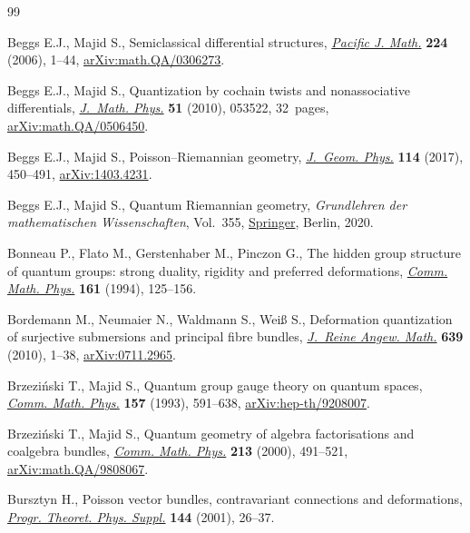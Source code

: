 \documentclass[10pt,a4paper]{amsart}
\numberwithin{equation}{section}
\newcommand{\<}{{\langle}}
\renewcommand{\>}{{\rangle}}
\begin{document}
\begin{thebibliography}{99}
\footnotesize\itemsep=-1pt

Beggs E.J., Majid S., Semiclassical differential structures, \href{https://doi.org/10.2140/pjm.2006.224.1}{\textit{Pacific J.
 Math.}} \textbf{224} (2006), 1--44, \href{https://arxiv.org/abs/math.QA/0306273}{arXiv:math.QA/0306273}.

Beggs E.J., Majid S., Quantization by cochain twists and nonassociative
 differentials, \href{https://doi.org/10.1063/1.3371677}{\textit{J.~Math. Phys.}} \textbf{51} (2010), 053522, 32~pages,
 \href{https://arxiv.org/abs/math.QA/0506450}{arXiv:math.QA/0506450}.

Beggs E.J., Majid S., Poisson--{R}iemannian geometry, \href{https://doi.org/10.1016/j.geomphys.2016.12.012}{\textit{J.~Geom. Phys.}}
 \textbf{114} (2017), 450--491, \href{https://arxiv.org/abs/1403.4231}{arXiv:1403.4231}.

Beggs E.J., Majid S., Quantum {R}iemannian geometry, \textit{Grundlehren der
 mathematischen Wissenschaften}, Vol.~355, \href{https://doi.org/10.1007/978-3-030-30294-8}{Springer}, Berlin, 2020.

Bonneau P., Flato M., Gerstenhaber M., Pinczon G., The hidden group structure
 of quantum groups: strong duality, rigidity and preferred deformations,
 \href{https://doi.org/10.1007/BF02099415}{\textit{Comm. Math. Phys.}} \textbf{161} (1994), 125--156.

Bordemann M., Neumaier N., Waldmann S., Wei{\ss} S., Deformation quantization
 of surjective submersions and principal fibre bundles, \href{https://doi.org/10.1515/CRELLE.2010.009}{\textit{J.~Reine
 Angew. Math.}} \textbf{639} (2010), 1--38, \href{https://arxiv.org/abs/0711.2965}{arXiv:0711.2965}.

Brzezi\'nski T., Majid S., Quantum group gauge theory on quantum spaces,
 \href{https://doi.org/10.1007/BF02096884}{\textit{Comm. Math. Phys.}} \textbf{157} (1993), 591--638,
 \href{https://arxiv.org/abs/hep-th/9208007}{arXiv:hep-th/9208007}.

Brzezi\'nski T., Majid S., Quantum geometry of algebra factorisations and
 coalgebra bundles, \href{https://doi.org/10.1007/PL00005530}{\textit{Comm. Math. Phys.}} \textbf{213} (2000), 491--521,
 \href{https://arxiv.org/abs/math.QA/9808067}{arXiv:math.QA/9808067}.

Bursztyn H., Poisson vector bundles, contravariant connections and
 deformations, \href{https://doi.org/10.1143/PTPS.144.26}{\textit{Progr. Theoret. Phys. Suppl.}} \textbf{144} (2001),
 26--37.


\end{thebibliography}
\end{document}
